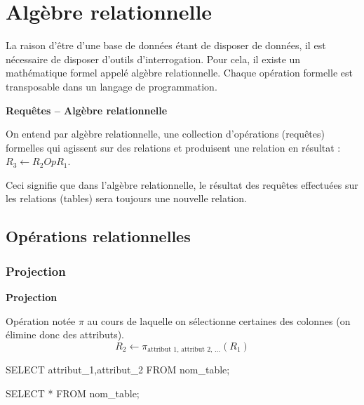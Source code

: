 \documentclass[10pt]{article}
\begin{document}
\section{Algèbre relationnelle}
La raison d'être d'une base de données étant de disposer de données, il est nécessaire de disposer d'outils d'interrogation. Pour cela, il existe un mathématique formel appelé algèbre relationnelle. Chaque opération formelle est transposable dans un langage de programmation. 





\begin{defi}
\textbf{Requêtes -- Algèbre relationnelle}

On entend par algèbre relationnelle, une collection d'opérations (requêtes) formelles qui agissent sur des relations et produisent une relation en résultat : $R_3 \leftarrow R_2 Op R_1$.
\end{defi}

Ceci signifie que dans l'algèbre relationnelle, le résultat des requêtes effectuées sur les relations (tables) sera toujours une nouvelle relation. 
%
%
%
%


\subsection{Opérations relationnelles}
\subsubsection{Projection}

\begin{defi}

\textbf{Projection}

Opération notée $\pi$ au cours de laquelle on sélectionne certaines des colonnes (on élimine donc des attributs). 
$$
 R_2 \leftarrow \pi_{\text{attribut 1, attribut 2, ...}}(R_1)
$$

\begin{envsql}
\begin{sql}
SELECT attribut_1,attribut_2 FROM nom_table;

SELECT * FROM nom_table;
\end{sql}
\end{envsql}
\end{defi}
\end{document}

